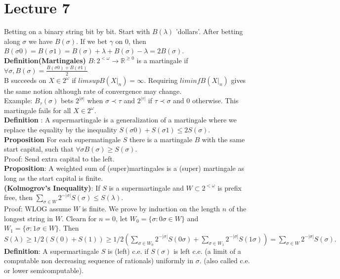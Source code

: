 \documentclass{article}
\begin{document}
	\section{Lecture 7}
 Betting on a binary string bit by bit. Start with $B(\lambda)$ 'dollars'. After betting along $\sigma$ we have $B(\sigma)$. If we bet $\gamma$ on $0$, then $B(\sigma0) = B(\sigma 1) = B(\sigma)+ \lambda + B(\sigma) - \lambda = 2 B(\sigma)$.\\
 	\textbf{Definition(Martingales)}  $B: 2^{<\omega} \to \mathbb{R}^{\geq 0}$ is a martingale if \\$\forall \sigma , B(\sigma) = \frac{B(\sigma0) + B(\sigma 1)}{2}$
	\\ B succeeds on $X \in 2^\omega$ if $lim sup B(X|_n) = \infty$. 
	Requiring $lim inf B(X|_n)$ gives the same notion although rate of convergence may change.\\
	Example: $B_\tau(\sigma)$ bets $2^{|\sigma|} $ when $\sigma \prec \tau$ and $2^{|\tau|}$ if $\tau \prec \sigma$ and $0$ otherwise. This martingale fails for all $X\in 2^\omega$. \\
	\textbf{Definition} : A supermartingale is a generalization of a martingale where we replace the equality by the inequality $S(\sigma 0 ) + S(\sigma 1) \leq 2S(\sigma)$.\\
	\textbf{Proposition} For each supermatingale $S$ there is a martingale $B$ with the same start capital, such that $\forall \sigma B(\sigma) \geq S(\sigma)$.\\
	Proof: Send extra capital to the left.\\
	\textbf{Proposition}: A weighted sum of (super)martingales is a (super) martingale as long as the start capital is finite.\\
	\textbf{(Kolmogrov's Inequality)}: If $S$ is a supermartingale and $W\subset 2^{<\omega}$ is prefix free, then $\sum_{\sigma \in W} 2^{-|\sigma|} S(\sigma) \leq S(\lambda)$.\\
	Proof: WLOG assume $W$ is finite. We prove by induction on the length $n$ of the longest string in $W$. Clearn for $n=0$, let $W_0 = \{\sigma: 0\sigma \in W\}$ and $W_1 = \{\sigma: 1\sigma \in W\}$. Then $S(\lambda) \geq 1/2 (S(0) + S(1)) \geq 1/2(\sum_{\sigma \in W_0} 2^{-|\sigma| }S(0\sigma)+ \sum_{\sigma \in W_1} 2^{-|\sigma| }S(1\sigma) ) = \sum_{\sigma \in W} 2^{-|\sigma|} S(\sigma).$\\
	\textbf{Definition}: A supermartingale $S$ is (left) c.e. if $S(\sigma)$ is left c.e. (a limit of a computable non decreasing sequence of rationals) uniformly in $\sigma$. (also called c.e. or lower semicomputable).
\end{document}
